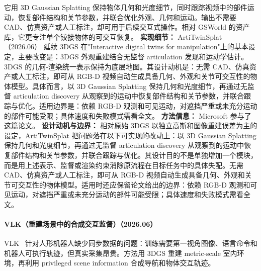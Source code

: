 它用 3D Gaussian Splatting 保持物体几何和光度细节，同时跟踪视频中的部件运动，恢复部件结构和关节参数，并联合优化外观、几何和运动。输出不需要 CAD、仿真资产或人工标注，却可用于后续交互式操作。相对 GSWorld 的资产库，它更专注单个铰接物体的可交互恢复。
\textbf{实现细节：} ArtiTwinSplat（2026.06） 延续 3DGS 在"Interactive digital twins for manipulation"上的基本设定，主要改变是：3DGS 外观重建结合无监督 articulation 发现和运动学估计。3DGS 的几何-渲染统一表示保持为底层地图。其设计动机是：无需 CAD、仿真资产或人工标注，即可从 RGB-D 视频自动生成具备几何、外观和关节可交互性的物体模型。具体而言，以 3D Gaussian Splatting 保持几何和光度细节，再通过无监督 articulation discovery 从观察到的运动中恢复部件结构和关节参数，并联合跟踪与优化。适用边界是：依赖 RGB-D 观测和可见运动，对遮挡严重或未充分运动的部件可能受限；具体速度和失败模式需看全文。
\textbf{方法信息：} Microsoft 参与了这篇论文。
\textbf{设计动机与边界：} 相对原始 3DGS 以独立高斯和图像重建误差为主的设定，ArtiTwinSplat 把问题落在以下可实现的改动上：以 3D Gaussian Splatting 保持几何和光度细节，再通过无监督 articulation discovery 从观察到的运动中恢复部件结构和关节参数，并联合跟踪与优化。其设计目的不是单独增加一个模块，而是用上述表示、监督或渲染约束消除原流程在目标任务中的具体失配。无需 CAD、仿真资产或人工标注，即可从 RGB-D 视频自动生成具备几何、外观和关节可交互性的物体模型。适用时还应保留论文给出的边界：依赖 RGB-D 观测和可见运动，对遮挡严重或未充分运动的部件可能受限；具体速度和失败模式需看全文。
\paragraph{VLK（重建场景中的合成交互监督）（2026.06）}
VLK~\cite{2606_30645} 针对人形机器人缺少同步数据的问题：训练需要第一视角图像、语言命令和机器人可执行轨迹，但真实采集昂贵。方法用 3DGS 重建 metric-scale 室内环境，再利用 privileged scene information 合成导航和物体交互轨迹。


